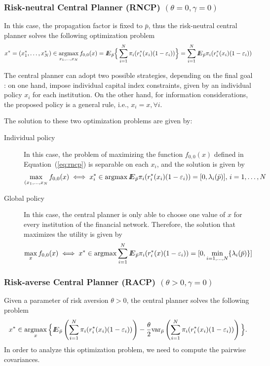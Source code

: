 \subsubsection{Risk-neutral Central Planner (RNCP) $(\theta=0,\gamma=0)$}
In this case, the propagation factor is fixed to $\bar p$, thus the risk-neutral central planner solves the following optimization problem
\begin{equation}\label{eq:rncp}
x^*=(x_1^*,\ldots,x_N^*)\in\mathop{\rm argmax}_{x_1,\ldots,x_N} f_{0,0}(x)={I\kern-.35em E}_{\bar p}\Big\lbrace\sum_{i=1}^N \pi_i(r_i^*(x_i)(1-\varepsilon_i))\Big\rbrace = \sum_{i=1}^N {I\kern-.35em E}_{\bar p} \pi_i(r_i^*(x_i)(1-\varepsilon_i))
\end{equation}

The central planner can adopt two possible strategies, depending on the final goal : on one hand, impose individual capital index constraints, given by an individual policy $x_i$ for each institution. On the other hand, for information considerations, the proposed policy is a general rule, i.e., $x_i=x,\forall i$.

The solution to these two optimization problems are given by:
\begin{description}
\item[Individual policy] In this case, the problem of maximizing the function $f_{0,0}(x)$ defined in Equation~(\ref{eq:rncp}) is separable on each $x_i$, and the solution is given by
\begin{equation}\label{eq:solrncpi}
\max_{(x_1,\ldots,x_N} f_{0,0}(x)\iff x_i^*\in\mathop{\rm argmax} {I\kern-.35em E}_{\bar{p}}\pi_i(r^*_i(x_i)(1-\varepsilon_i))=[0,\lambda_i(\bar{p})],\,i=1,\ldots,N
\end{equation}

\item[Global policy] In this case, the central planner is only able to choose one value of $x$ for every institution of the financial network.  Therefore, the solution that maximizes the utility is given by
\begin{equation}\label{eq:solrncpu}
\max_{x} f_{0,0}(x)\iff x^*\in\mathop{\rm argmax} \sum_{i=1}^N {I\kern-.35em E}_{\bar{p}}\pi_i(r^*_i(x)(1-\varepsilon_i))=[0,\min_{i=1,\ldots,N}\{\lambda_i(\bar{p})\}]
\end{equation}
\end{description}

\subsubsection{Risk-averse Central Planner (RACP) $(\theta>0,\gamma=0)$}
Given a parameter of risk aversion $\theta>0$, the central planner solves the following problem
\begin{equation}\label{eq:racp}
x^*\in\mathop{\rm argmax}_{x} \Big\lbrace {I\kern-.35em E}_{\bar p}\left(\sum_{i=1}^N \pi_i(r^*_i(x_i)(1-\varepsilon_i))\right) - \frac{\theta}{2}{\mathop{\rm var}\nolimits}_{\bar p} \left(\sum_{i=1}^N \pi_i(r^*_i(x_i)(1-\varepsilon_i))\right)\Big\rbrace.
\end{equation}
In order to analyze this optimization problem, we need to compute the pairwise covariances. 

